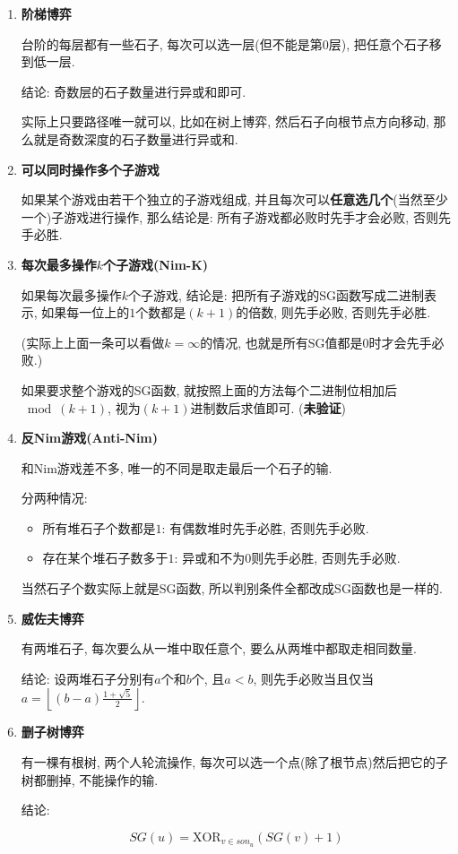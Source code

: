 \begin{enumerate}

\item \textbf{阶梯博弈}

台阶的每层都有一些石子, 每次可以选一层(但不能是第$0$层), 把任意个石子移到低一层.

结论: 奇数层的石子数量进行异或和即可.

实际上只要路径唯一就可以, 比如在树上博弈, 然后石子向根节点方向移动, 那么就是奇数深度的石子数量进行异或和.

\item \textbf{可以同时操作多个子游戏}

如果某个游戏由若干个独立的子游戏组成, 并且每次可以\textbf{任意选几个}(当然至少一个)子游戏进行操作, 那么结论是: 所有子游戏都必败时先手才会必败, 否则先手必胜.

\item \textbf{每次最多操作$k$个子游戏(Nim-K)}

如果每次最多操作$k$个子游戏, 结论是: 把所有子游戏的SG函数写成二进制表示, 如果每一位上的$1$个数都是$(k+1)$的倍数, 则先手必败, 否则先手必胜.

(实际上上面一条可以看做$k=\infty$的情况, 也就是所有SG值都是$0$时才会先手必败.)

如果要求整个游戏的SG函数, 就按照上面的方法每个二进制位相加后$\bmod (k+1)$, 视为$(k+1)$进制数后求值即可. (\textbf{未验证})

\item \textbf{反Nim游戏(Anti-Nim)}

和Nim游戏差不多, 唯一的不同是取走最后一个石子的输.

分两种情况:

\begin{itemize}
	\item 所有堆石子个数都是$1$: 有偶数堆时先手必胜, 否则先手必败.
	\item 存在某个堆石子数多于$1$: 异或和不为$0$则先手必胜, 否则先手必败.
\end{itemize}

当然石子个数实际上就是SG函数, 所以判别条件全都改成SG函数也是一样的.

\item \textbf{威佐夫博弈}

有两堆石子, 每次要么从一堆中取任意个, 要么从两堆中都取走相同数量.

结论: 设两堆石子分别有$a$个和$b$个, 且$a<b$, 则先手必败当且仅当$a = \left\lfloor (b-a)\frac {1 + \sqrt 5} 2 \right\rfloor$.

\item \textbf{删子树博弈}

有一棵有根树, 两个人轮流操作, 每次可以选一个点(除了根节点)然后把它的子树都删掉, 不能操作的输.

结论:

$$ SG(u) = \text{XOR} _{v \in son_u} \left( SG(v) + 1 \right) $$

\end{enumerate}